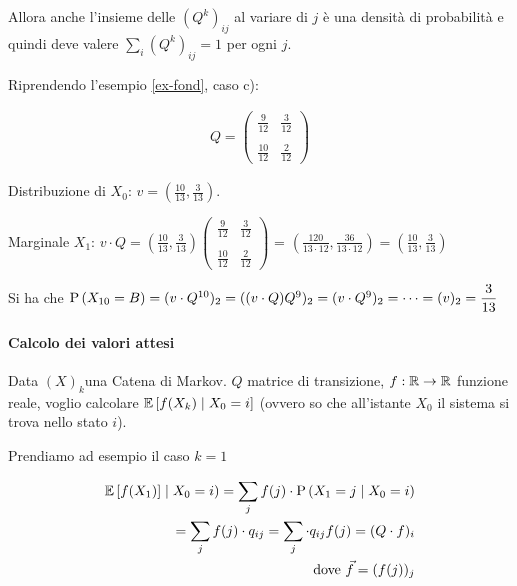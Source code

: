 Allora anche l'insieme delle $ (Q^k)_{ij}$ al variare di $j$ \`e una densit\`a di probabilit\`a e quindi deve valere
$\sum_i (Q^k)_{ij}=1$ per ogni $j$.
\begin{exmp}\label{ex-inv}
	Riprendendo l'esempio \ref{ex-fond}, caso c):
	
	\begin{equation*}
	\begin{aligned}
	Q=\begin{pmatrix}
	\frac{9}{12} & \frac{3}{12} \\
	&\\
	\frac{10}{12} & \frac{2}{12}
	\end{pmatrix}
	\end{aligned}
	\end{equation*}
	
	Distribuzione di $ X_0 $: $ v = (\frac{10}{13}, \frac{3}{13}) $.
	
	Marginale $ X_1 $: $ v \cdot Q = (\frac{10}{13}, \frac{3}{13})\begin{pmatrix}
	\frac{9}{12} & \frac{3}{12} \\
	&\\
	\frac{10}{12} & \frac{2}{12}
	\end{pmatrix} $ = $ (\frac{120}{13 \cdot 12}, \frac{36}{13 \cdot 12}) = \left( \frac{10}{13}, \frac{3}{13} \right)$
	
	Si ha che $ \text{P}\left(X_{10} = B\right) = (v \cdot Q^{10})_2= ((v \cdot Q) Q^9)_2 = (v \cdot Q^9)_2 =
	\dots=(v)_2 ={\dfrac{3}{13}} $
	
\end{exmp}

\paragraph{Calcolo dei valori attesi}

Data $ (X)_k $una Catena di Markov. $ Q $ matrice di transizione, $ f : \mathbb{R} \to \mathbb{R}$ funzione reale, voglio calcolare $ \mathbb{E}\left[f(X_k) \mid X_0 = i\right] $ (ovvero so che all'istante $X_0$ il sistema si trova nello stato $i$).

Prendiamo ad esempio il caso $ k = 1 $

\begin{equation*}
	\begin{aligned}
	\mathbb{E}\left[f(X_1)\right] \mid X_0 = i) = \sum_j f(j) \cdot \text{P}\left(X_1 = j \mid X_0 = i\right) \\
	= \sum_j f(j) \cdot q_{ij} = \sum_j \cdot q_{ij}  f(j)= (Q \cdot f)_i \\
	\text{dove }\vec{f} = (f(j))_j
	\end{aligned}
\end{equation*}

